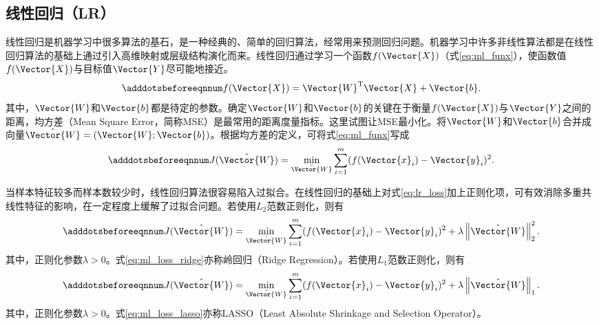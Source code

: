 \subsection{线性回归（LR）}\label{sec:ml_lr}

线性回归是机器学习中很多算法的基石，是一种经典的、简单的回归算法，经常用来预测回归问题。机器学习中许多非线性算法都是在线性回归算法的基础上通过引入高维映射或层级结构演化而来。线性回归通过学习一个函数$f(\Vector{X})$（式\ref{eq:ml_funx}），使函数值$f(\Vector{X})$与目标值$\Vector{Y}$尽可能地接近。
\begin{equation}\adddotsbeforeeqnnum
  \label{eq:ml_funx}
  f(\Vector{X})=\Vector{W}^{\text{T}}\Vector{X}+\Vector{b}.
\end{equation}
其中，$\Vector{W}$和$\Vector{b}$都是待定的参数。确定$\Vector{W}$和$\Vector{b}$的关键在于衡量$f(\Vector{X})$与$\Vector{Y}$之间的距离，均方差（Mean Square Error，简称MSE）是最常用的距离度量指标。这里试图让MSE最小化。将$\Vector{W}$和$\Vector{b}$合并成向量$\hat{\Vector{W}}=(\Vector{W};\Vector{b})$。根据均方差的定义，可将式\ref{eq:ml_funx}写成
\begin{equation}\adddotsbeforeeqnnum
  \label{eq:lr_loss}
  J(\hat{\Vector{W}})=\min_{\hat{\Vector{W}}}\sum_{i=1}^{m}(f(\Vector{x}_i)-\Vector{y}_i)^2.
\end{equation}

当样本特征较多而样本数较少时，线性回归算法很容易陷入过拟合。在线性回归的基础上对式\ref{eq:lr_loss}加上正则化项，可有效消除多重共线性特征的影响，在一定程度上缓解了过拟合问题。若使用$L_2$范数正则化，则有
\begin{equation}\adddotsbeforeeqnnum
  \label{eq:ml_loss_ridge}
  J(\hat{\Vector{W}})=\min_{\hat{\Vector{W}}}\sum_{i=1}^{m}(f(\Vector{x}_i)-\Vector{y}_i)^2+\lambda\left\|\hat{\Vector{W}}\right\|_2^2.
\end{equation}
其中，正则化参数$\lambda>0$。式\ref{eq:ml_loss_ridge}亦称岭回归（Ridge Regression）。若使用$L_1$范数正则化，则有
\begin{equation}\adddotsbeforeeqnnum
  \label{eq:ml_loss_lasso}
  J(\hat{\Vector{W}})=\min_{\hat{\Vector{W}}}\sum_{i=1}^{m}(f(\Vector{x}_i)-\Vector{y}_i)^2+\lambda\left\|\hat{\Vector{W}}\right\|_1.
\end{equation}
其中，正则化参数$\lambda>0$。式\ref{eq:ml_loss_lasso}亦称LASSO（Least Absolute Shrinkage and Selection Operator）。

